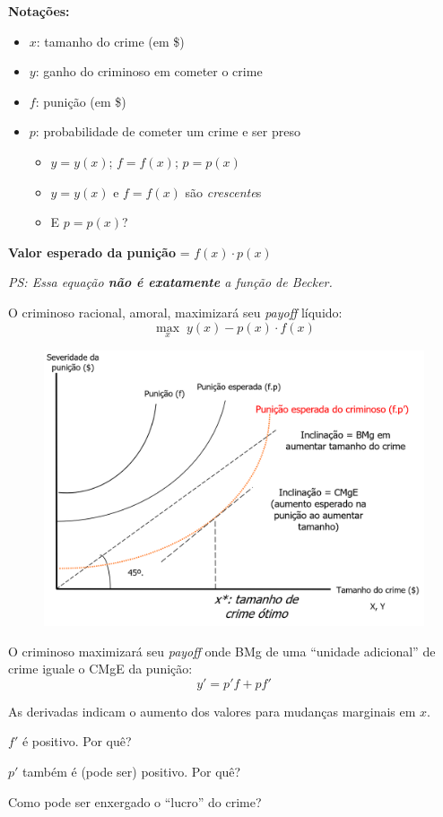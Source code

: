 \documentclass[a4paper,12pt]{article}[abntex2]
\begin{document}
\textbf{Notações:}
\begin{itemize}
  \item $x$: tamanho do crime (em \$)
  \item $y$: ganho do criminoso em cometer o crime
  \item $f$: punição (em \$)
  \item $p$: probabilidade de cometer um crime e ser preso
  \begin{itemize}
    \item $y = y(x)$; $f = f(x)$; $p = p(x)$
    \item $y = y(x)$ e $f = f(x)$ são \textit{crescente}s
    \item E $p = p(x)$?
  \end{itemize}
\end{itemize}

\textbf{Valor esperado da punição} = $f(x) \cdot p(x)$

\textit{ PS: Essa equação \textbf{não é exatamente} a função de Becker.}

O criminoso racional, amoral, maximizará seu \textit{payoff} líquido:
\[
\max_{x} \; y(x) - p(x) \cdot f(x)
\]
\begin{figure}[H]
    \centering
    \includegraphics[width=0.7\linewidth]{Imagens/a19i3.png}
\end{figure}

O criminoso maximizará seu \textit{payoff} onde BMg de uma ``unidade adicional'' de crime iguale o CMgE da punição:
\[
y' = p'f + pf'
\]

As derivadas indicam o aumento dos valores para mudanças marginais em $x$.

$f'$ é positivo. Por quê?

$p'$ também é (pode ser) positivo. Por quê?

Como pode ser enxergado o “lucro” do crime? 
\end{document}

